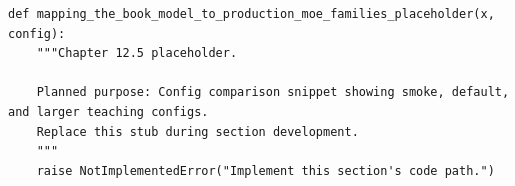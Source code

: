 \begin{lstlisting}[style=bookpython,caption={Planned code placeholder for mapping the book model to production MoE families.},label={lst:ch12-mapping-the-book-model-to-production-moe-families}]
def mapping_the_book_model_to_production_moe_families_placeholder(x, config):
    """Chapter 12.5 placeholder.

    Planned purpose: Config comparison snippet showing smoke, default, and larger teaching configs.
    Replace this stub during section development.
    """
    raise NotImplementedError("Implement this section's code path.")
\end{lstlisting}
